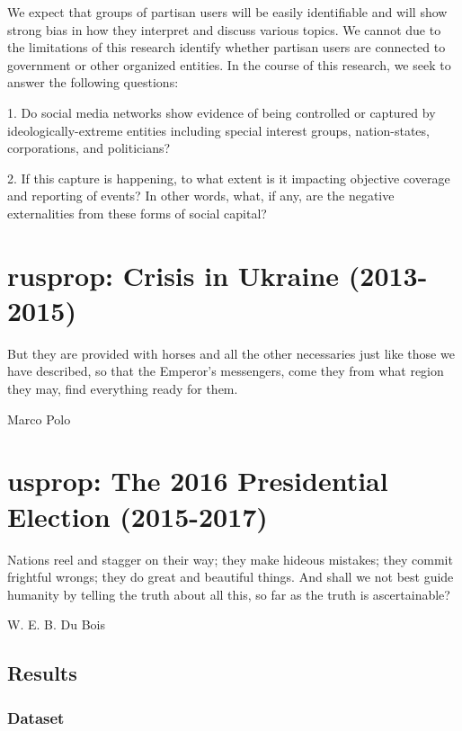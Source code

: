 \documentclass[doublespacing]{utdthesis}
\begin{document}
We expect that groups of partisan users will be easily identifiable and will show strong bias in how they interpret and discuss various topics.
We cannot due to the limitations of this research identify whether partisan users are connected to government or other organized entities.
In the course of this research, we seek to answer the following questions:

1. Do social media networks show evidence of being controlled or captured by ideologically-extreme entities including special interest groups, nation-states, corporations, and politicians?

2. If this capture is happening, to what extent is it impacting objective coverage and reporting of events? In other words, what, if any, are the negative externalities from these forms of social capital?

\chapter{rusprop: Crisis in Ukraine (2013-2015)}
\label{c:rus}
\epigraph{But they are provided with horses and all the other necessaries just like those we have described, so that the Emperor's messengers, come they from what region they may, find everything ready for them.}{Marco Polo}


\chapter{usprop: The 2016 Presidential Election (2015-2017)}
\epigraph{Nations reel and stagger on their way; they make hideous mistakes; they commit frightful wrongs; they do great and beautiful things. And shall we not best guide humanity by telling the truth about all this, so far as the truth is ascertainable?}{W. E. B. Du Bois}



\section{Results}

\subsection{Dataset}
\end{document}
